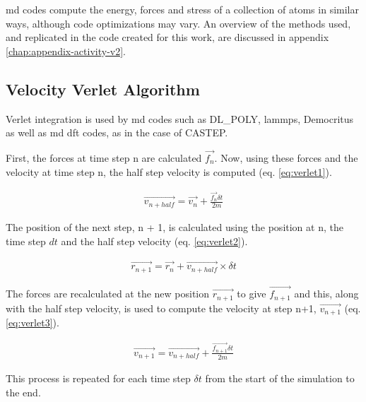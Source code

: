 \acrshort{md} codes compute the energy, forces and stress of a collection of atoms in similar ways, although code optimizations may vary.  An overview of the methods used, and replicated in the code created for this work, are discussed in appendix \ref{chap:appendix-activity-v2}.




\subsection{Velocity Verlet Algorithm}

Verlet integration is used by \acrshort{md} codes such as DL\_POLY, \acrshort{lammps}, Democritus as well as \acrshort{md} \acrshort{dft} codes, as in the case of CASTEP.  

First, the forces at time step n are calculated $\vec{f_{n}}$.  Now, using these forces and the velocity at time step n, the half step velocity is computed (eq. \ref{eq:verlet1}).

\begin{equation}
\begin{split}
\vec{v_{n+half}} = \vec{v_{n}} + \frac{\vec{f_{n}} \delta t}{2 m}
\end{split}
\label{eq:verlet1}
\end{equation}

The position of the next step, n + 1, is calculated using the position at n, the time step $dt$ and the half step velocity (eq. \ref{eq:verlet2}).

\begin{equation}
\begin{split}
\vec{r_{n+1}} = \vec{r_{n}} + \vec{v_{n+half}} \times \delta t
\end{split}
\label{eq:verlet2}
\end{equation}

The forces are recalculated at the new position $\vec{r_{n+1}}$ to give $\vec{f_{n+1}}$ and this, along with the half step velocity, is used to compute the velocity at step n+1, $\vec{v_{n+1}}$ (eq. \ref{eq:verlet3}). 

\begin{equation}
\begin{split}
\vec{v_{n+1}} = \vec{v_{n+half}} + \frac{\vec{f_{n+1}} \delta t}{2 m}
\end{split}
\label{eq:verlet3}
\end{equation}

This process is repeated for each time step $\delta t$ from the start of the simulation to the end.  







